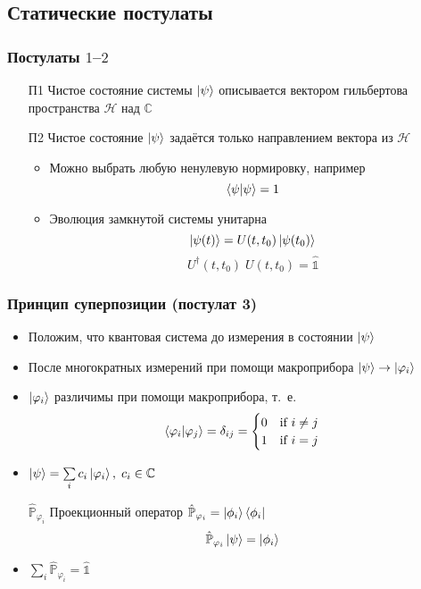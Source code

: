 \subsection{Статические постулаты}
\begin{frame}
    \frametitle{Постулаты $1$--$2$}
    \begin{itemize}[<+->]
    \item[П1] Чистое состояние системы $\ket{\psi}$ описывается
    вектором гильбертова пространства $\mathcal{H}$ над $\mathbb{C}$
    \item[П2] Чистое состояние $\ket{\psi}$ задаётся
    только направлением вектора из $\mathcal{H}$
        \begin{itemize}[<+->]
        \item Можно выбрать любую ненулевую нормировку, например
        $$ \braket{\psi|\psi} = 1 $$
        \item Эволюция замкнутой системы унитарна
        $$ \ket{\psi (t)} = U (t, t_0) \ket{\psi (t_0)}$$
        $$ U^\dagger (t, t_0) \; U (t, t_0) = \hat{\mathbb{1}} $$
        \end{itemize}
    \end{itemize}
\end{frame}
\begin{frame}
    \frametitle{Принцип суперпозиции (постулат 3)}
    \begin{itemize}[<+->]
    \item Положим, что квантовая система до измерения в состоянии
    $\ket{\psi}$
    \item После многократных измерений при помощи макроприбора
    $\ket{\psi} \to \ket{\varphi_i}$
    \item $\ket{\varphi_i}$ различимы при помощи макроприбора, т.~е.
    $$ \braket {\varphi_i| \varphi_j} = \delta_{ij} = 
        \begin{cases}
        0 & \text {if $i \ne j $} \\
        1 & \text {if $i = j $}
        \end{cases}
    $$
    \item
    $ \ket {\psi} = \sum\limits_i c_i \ket {\varphi_i},\;c_i \in \mathbb{C} $
    \item[$\hat{\mathbb{P}}_{\varphi_i}$] Проекционный оператор
    $\hat{\mathbb{P}}_{\varphi_i} = \ket{\phi_i}\bra{\phi_i}$
    $$\hat{\mathbb{P}}_{\varphi_i}\ket{\psi} = \ket{\phi_i}$$
    \item $\sum\limits_i \hat{\mathbb{P}}_{\varphi_i} = \hat{\mathbb{1}}$
    \end{itemize}
\end{frame}
